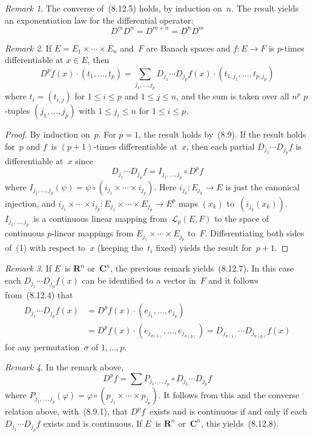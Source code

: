 \documentclass[letterpaper,12pt]{article}
\newcommand{\R}{\mathbf{R}}
\newcommand{\C}{\mathbf{C}}
\renewcommand{\L}{\mathcal{L}}
\newcommand{\after}{\circ}
\newcommand{\at}{\cdot}
\theoremstyle{plain}
\theoremstyle{definition}
\theoremstyle{remark}
\newtheorem*{rmk}{Remark}
\begin{document}
\begin{rmk}
The converse of~(8.12.5) holds, by induction on~\(n\). The result yields an exponentiation law for the differential operator:
\[D^m D^n=D^{m+n}=D^n D^m\]
\end{rmk}

\begin{rmk}
If \(E=E_1\times\cdots\times E_n\) and~\(F\) are Banach spaces and \(f:E\to F\) is \(p\)-times differentiable at \(x\in E\), then
\[D^pf(x)\at(t_1,\ldots,t_p)=\sum_{j_1,\ldots,j_p}D_{j_1}\cdots D_{j_p}f(x)\at(t_{1,j_1},\ldots,t_{p,j_p})\tag{1}\]
where \(t_i=(t_{i,j})\) for \(1\le i\le p\) and \(1\le j\le n\), and the sum is taken over all \(n^p\) \(p\)-tuples \((j_1,\ldots,j_p)\) with \(1\le j_i\le n\) for \(1\le i\le p\).
\end{rmk}
\begin{proof}
By induction on~\(p\). For \(p=1\), the result holds by~(8.9). If the result holds for~\(p\) and \(f\)~is \((p+1)\)-times differentiable at~\(x\), then each partial \(D_{j_1}\cdots D_{j_p}f\) is differentiable at~\(x\) since
\[D_{j_1}\cdots D_{j_p}f=I_{j_1,\ldots,j_p}\after D^pf\]
where \(I_{j_1,\ldots,j_p}(\psi)=\psi\after(i_{j_1}\times\cdots\times i_{j_p})\). Here \(i_{j_k}:E_{j_k}\to E\) is just the canonical injection, and \(i_{j_1}\times\cdots\times i_{j_p}:E_{j_1}\times\cdots\times E_{j_p}\to E^p\) maps \((x_k)\) to~\((i_{j_k}(x_k))\). \(I_{j_1,\ldots,j_p}\)~is a continuous linear mapping from~\(\L_p(E,F)\) to the space of continuous \(p\)-linear mappings from \(E_{j_1}\times\cdots\times E_{j_p}\) to~\(F\). Differentiating both sides of~(1) with respect to~\(x\) (keeping the~\(t_i\) fixed) yields the result for~\(p+1\).
\end{proof}

\begin{rmk}
If \(E\)~is \(\R^n\) or~\(\C^n\), the previous remark yields~(8.12.7). In this case each \(D_{j_1}\cdots D_{j_p}f(x)\) can be identified to a vector in~\(F\) and it follows from~(8.12.4) that
\begin{align*}
D_{j_1}\cdots D_{j_p}f(x)&=D^pf(x)\at(e_{j_1},\ldots,e_{j_p})\\
	&=D^pf(x)\at(e_{j_{\sigma(1)}},\ldots,e_{j_{\sigma(p)}})=D_{j_{\sigma(1)}}\cdots D_{j_{\sigma(p)}}f(x)
\end{align*}
for any permutation~\(\sigma\) of \(1,\ldots,p\).
\end{rmk}

\begin{rmk}
In the remark above,
\[D^pf=\sum P_{j_1,\ldots,j_p}\after D_{j_1}\cdots D_{j_p}f\]
where \(P_{j_1,\ldots,j_p}(\varphi)=\varphi\after(p_{j_1}\times\cdots\times p_{j_p})\). It follows from this and the converse relation above, with~(8.9.1), that \(D^pf\)~exists and is continuous if and only if each \(D_{j_1}\cdots D_{j_p}f\) exists and is continuous. If \(E\)~is \(\R^n\) or~\(\C^n\), this yields~(8.12.8).
\end{rmk}
\end{document}
